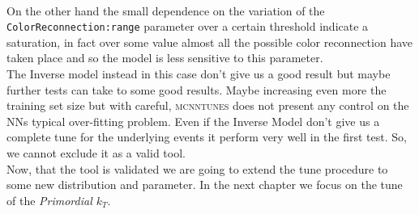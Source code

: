 \\ 
On the other hand the small dependence on the variation of the \texttt{ColorReconnection:range} parameter over a certain threshold indicate a saturation, in fact over some value almost all the possible color reconnection have taken place and so the model is less sensitive to this parameter.   
\\
The Inverse model instead in this case don't give us a good result but maybe further tests can take to some good results. Maybe increasing even more the training set size but with careful, \textsc{mcnntunes} does not present any control on the NNs typical over-fitting problem. Even if the Inverse Model don't give us a complete tune for the underlying events it perform very well in the first test. So, we cannot exclude it as a valid tool. 
\\
Now, that the tool is validated we are going to extend the tune procedure to some new distribution and parameter. In the next chapter we focus on the tune of the \textit{Primordial $k_T$}.




